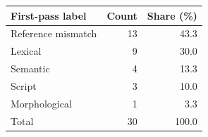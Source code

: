 \begin{tabular}{@{}lrr@{}}
\toprule
First-pass label & Count & Share (\%) \\
\midrule
Reference mismatch & 13 & 43.3 \\
Lexical & 9 & 30.0 \\
Semantic & 4 & 13.3 \\
Script & 3 & 10.0 \\
Morphological & 1 & 3.3 \\
\midrule
Total & 30 & 100.0 \\
\bottomrule
\end{tabular}
